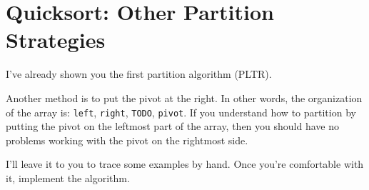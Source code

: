 \section{Quicksort: Other Partition Strategies}

I've already shown you the first partition algorithm (PLTR).

Another method is to put the pivot at the right.
In other words, the organization of the array is:
\verb!left!, \verb!right!, \verb!TODO!, \verb!pivot!.
If you understand how to partition by putting the pivot on the leftmost
part of the array, then you should have no problems working with the pivot
on the rightmost side.

I'll leave it to you to trace some examples by hand.
Once you're comfortable with it, implement the algorithm.
